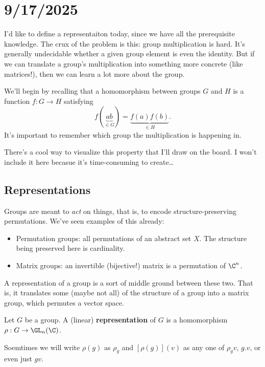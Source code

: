 \section{9/17/2025}

I'd like to define a representaiton today, since we have all the prerequisite knowledge.
The crux of the problem is this: group multiplication is hard.
It's generally undecidable whether a given group element is even the identity.
But if we can translate a group's multiplication into something more concrete (like matrices!),
then we can learn a lot more about the group.

We'll begin by recalling that a homomorphism between groups $G$ and $H$ 
is a function $f:G\to H$ satisfying \[ f(\underbrace{ab}_{\in G}) = \underbrace{f(a)f(b)}_{\in H}. \]
It's important to remember which group the multiplication is happening in.

There's a cool way to visualize this property that I'll draw on the board.
I won't include it here becasue it's time-consuming to create\dots

\subsection{Representations}
Groups are meant to {\it act} on things, that is, to encode structure-preserving permutations.
We've seen examples of this already:
\begin{itemize}
    \item Permutation groups: all permutations of an abstract set $X$. The structure being preserved here is cardinality.
    \item Matrix groups: an invertible (bijective!) matrix is a permutation of $\C^n$.
\end{itemize}

A representation of a group is a sort of middle ground between these two.
That is, it translates some (maybe not all) of the structure of a group into a matrix group, which permutes a vector space.

\begin{definition}
    Let $G$ be a group.
    A (linear) {\bf representation} of $G$ is a homomorphism $\rho:G \to \GL_n(\C)$.
\end{definition}

\begin{remark}
    Soemtimes we will write $\rho(g)$ as $\rho_g$ and $[\rho(g)](v)$ as any one of $\rho_g v$, $g.v$, or even just $gv$.
\end{remark}


